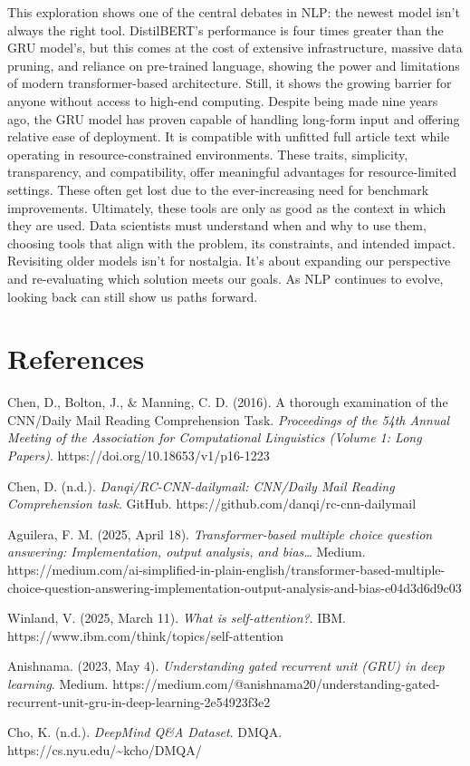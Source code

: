 \documentclass[11pt]{article}
\begin{document}
    This exploration shows one of the central debates in NLP: the newest
model isn't always the right tool. DistilBERT's performance is four
times greater than the GRU model's, but this comes at the cost of
extensive infrastructure, massive data pruning, and reliance on
pre-trained language, showing the power and limitations of modern
transformer-based architecture. Still, it shows the growing barrier for
anyone without access to high-end computing. Despite being made nine
years ago, the GRU model has proven capable of handling long-form input
and offering relative ease of deployment. It is compatible with unfitted
full article text while operating in resource-constrained environments.
These traits, simplicity, transparency, and compatibility, offer
meaningful advantages for resource-limited settings. These often get
lost due to the ever-increasing need for benchmark improvements.
Ultimately, these tools are only as good as the context in which they
are used. Data scientists must understand when and why to use them,
choosing tools that align with the problem, its constraints, and
intended impact. Revisiting older models isn't for nostalgia. It's about
expanding our perspective and re-evaluating which solution meets our
goals. As NLP continues to evolve, looking back can still show us paths
forward.

\section{References}\label{references}

Chen, D., Bolton, J., \& Manning, C. D. (2016). A thorough examination
of the CNN/Daily Mail Reading Comprehension Task. \emph{Proceedings of
the 54th Annual Meeting of the Association for Computational Linguistics
(Volume 1: Long Papers)}. https://doi.org/10.18653/v1/p16-1223

Chen, D. (n.d.). \emph{Danqi/RC-CNN-dailymail: CNN/Daily Mail Reading
Comprehension task}. GitHub. https://github.com/danqi/rc-cnn-dailymail

Aguilera, F. M. (2025, April 18). \emph{Transformer-based multiple
choice question answering: Implementation, output analysis, and
bias\ldots{}} Medium.
https://medium.com/ai-simplified-in-plain-english/transformer-based-multiple-choice-question-answering-implementation-output-analysis-and-bias-e04d3d6d9c03

Winland, V. (2025, March 11). \emph{What is self-attention?}. IBM.
https://www.ibm.com/think/topics/self-attention

Anishnama. (2023, May 4). \emph{Understanding gated recurrent unit (GRU)
in deep learning}. Medium.
https://medium.com/@anishnama20/understanding-gated-recurrent-unit-gru-in-deep-learning-2e54923f3e2

Cho, K. (n.d.). \emph{DeepMind Q\&A Dataset}. DMQA.
https://cs.nyu.edu/\textasciitilde kcho/DMQA/


    
    
    
\end{document}
